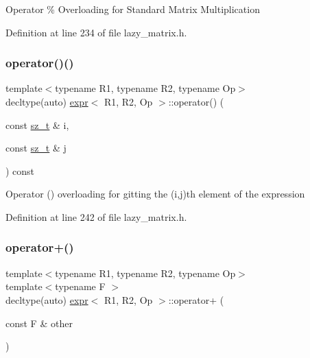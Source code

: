 Operator \% Overloading for Standard Matrix Multiplication 

Definition at line 234 of file lazy\+\_\+matrix.\+h.

\mbox{\label{classexpr_a095b81efbf9ed48db95750cd726460a2}} 
\subsubsection{\texorpdfstring{operator()()}{operator()()}}
{\footnotesize\ttfamily template$<$typename R1, typename R2, typename Op$>$ \\
decltype(auto) \mbox{\hyperlink{classexpr}{expr}}$<$ R1, R2, Op $>$\+::operator() (\begin{DoxyParamCaption}\item[{const \mbox{\hyperlink{lazy__matrix_8h_acba2745dcfc55b2d05ff45adc6a0a015}{sz\+\_\+t}} \&}]{i,  }\item[{const \mbox{\hyperlink{lazy__matrix_8h_acba2745dcfc55b2d05ff45adc6a0a015}{sz\+\_\+t}} \&}]{j }\end{DoxyParamCaption}) const\hspace{0.3cm}{\ttfamily [inline]}}

Operator () overloading for gitting the (i,j)th element of the expression 

Definition at line 242 of file lazy\+\_\+matrix.\+h.

\mbox{\label{classexpr_a252251779aa235aed7a5a7fec6ebe995}} 
\subsubsection{\texorpdfstring{operator+()}{operator+()}}
{\footnotesize\ttfamily template$<$typename R1, typename R2, typename Op$>$ \\
template$<$typename F $>$ \\
decltype(auto) \mbox{\hyperlink{classexpr}{expr}}$<$ R1, R2, Op $>$\+::operator+ (\begin{DoxyParamCaption}\item[{const F \&}]{other }\end{DoxyParamCaption})\hspace{0.3cm}{\ttfamily [inline]}}

